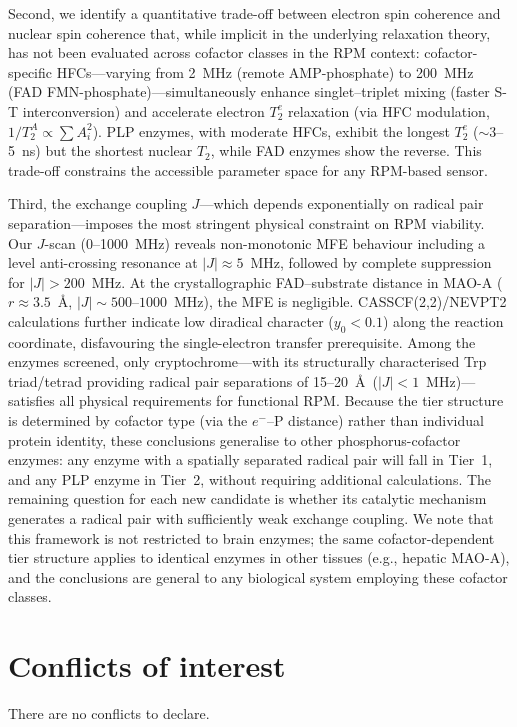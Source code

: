 \documentclass[twoside,twocolumn,9pt]{article}
\begin{document}
Second, we identify a quantitative trade-off between electron spin coherence and nuclear spin coherence that, while implicit in the underlying relaxation theory,\cite{Abragam1961} has not been evaluated across cofactor classes in the RPM context: cofactor-specific  HFCs---varying from 2~MHz (remote AMP-phosphate) to 200~MHz (FAD FMN-phosphate)---simultaneously enhance singlet--triplet mixing (faster S-T interconversion) and accelerate electron $T_2^e$ relaxation (via HFC modulation, $1/T_2^A \propto \sum A_i^2$). PLP enzymes, with moderate HFCs, exhibit the longest $T_2^e$ ($\sim$3--5~ns) but the shortest nuclear $T_2$, while FAD enzymes show the reverse. This trade-off constrains the accessible parameter space for any RPM-based sensor.

Third, the exchange coupling $J$---which depends exponentially on radical pair separation---imposes the most stringent physical constraint on RPM viability. Our $J$-scan (0--1000~MHz) reveals non-monotonic MFE behaviour including a level anti-crossing resonance at $|J| \approx 5$~MHz, followed by complete suppression for $|J| > 200$~MHz. At the crystallographic FAD--substrate distance in MAO-A ($r \approx 3.5$~\AA, $|J| \sim 500$--$1000$~MHz), the MFE is negligible. CASSCF(2,2)/NEVPT2 calculations further indicate low diradical character ($y_0 < 0.1$) along the reaction coordinate, disfavouring the single-electron transfer prerequisite. Among the enzymes screened, only cryptochrome---with its structurally characterised Trp triad/tetrad providing radical pair separations of 15--20~\AA\ ($|J| < 1$~MHz)\cite{Xu2021,Hiscock2016}---satisfies all physical requirements for functional RPM. Because the tier structure is determined by cofactor type (via the $e^-$--P distance) rather than individual protein identity, these conclusions generalise to other phosphorus-cofactor enzymes: any  enzyme with a spatially separated radical pair will fall in Tier~1, and any PLP enzyme in Tier~2, without requiring additional calculations. The remaining question for each new candidate is whether its catalytic mechanism generates a radical pair with sufficiently weak exchange coupling. We note that this framework is not restricted to brain enzymes; the same cofactor-dependent tier structure applies to identical enzymes in other tissues (e.g., hepatic MAO-A), and the conclusions are general to any biological system employing these cofactor classes.

\section*{Conflicts of interest}
There are no conflicts to declare.
\end{document}
